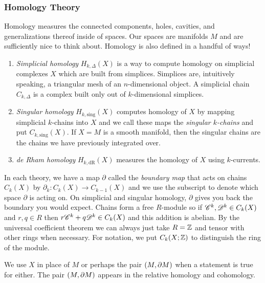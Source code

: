 \documentclass{article}
\begin{document}
\subsubsection{Homology Theory}
Homology measures the connected components, holes, cavities, and generalizations thereof inside of spaces. Our spaces are manifolds $M$ and are sufficiently nice to think about. Homology is also defined in a handful of ways! 
\begin{enumerate}
    \item \emph{Simplicial homology} $H_{k,\Delta}(X)$ is a way to compute homology on simplicial complexes $X$ which are built from simplices. Simplices are, intuitively speaking, a triangular mesh of an $n$-dimensional object. A simplicial chain $C_{k,\Delta}$ is a complex built only out of $k$-dimensional simplices.
    \item \emph{Singular homology} $H_{k,\textrm{sing}}(X)$ computes homology of $X$ by mapping simplicial $k$-chains into $X$ and we call these maps the \emph{singular $k$-chains} and put $C_{k,\textrm{sing}}(X)$. If $X=M$ is a smooth manifold, then the singular chains are the chains we have previously integrated over.
    \item \emph{de Rham homology} $H_{k,\textrm{dR}}(X)$ measures the homology of $X$ using $k$-currents.
\end{enumerate}
In each theory, we have a map $\partial$ called the \emph{boundary map} that acts on chains $C_k(X)$ by $\partial_k\colon C_k(X) \to C_{k-1}(X)$ and we use the subscript to denote which space $\partial$ is acting on. On simplicial and singular homology, $\partial$ gives you back the boundary you would expect. Chains form a free $R$-module so if $\mathscr{C}^k, \mathscr{D}^k \in C_k(X)$ and $r,q\in R$ then $r\mathscr{C}^k+q\mathscr{D}^k\in C_k(X)$ and this addition is abelian. By the universal coefficient theorem \cite{hatcher_algebraic_2002} we can always just take $R=\mathbb{Z}$ and tensor with other rings when necessary. For notation, we put $C_k(X;\mathbb{Z})$ to distinguish the ring of the module. 

\begin{remark}
We use $X$ in place of $M$ or perhaps the pair $(M,{\partial M})$ when a statement is true for either. The pair $(M,{\partial M})$ appears in the relative homology and cohomology. 
\end{remark}
\end{document}

